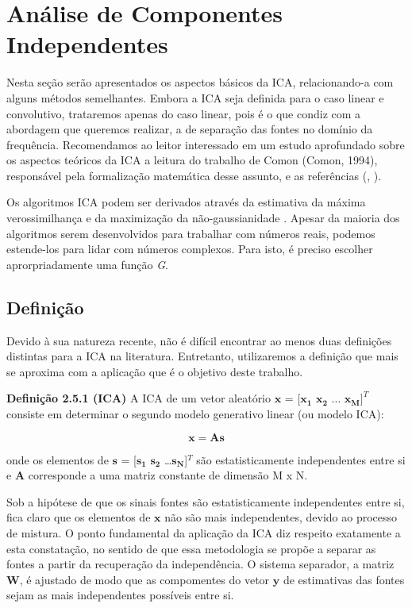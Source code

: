 \section{Análise de Componentes Independentes}
    Nesta seção serão apresentados os aspectos básicos da ICA, relacionando-a com alguns métodos semelhantes. Embora a ICA seja definida para o caso linear e convolutivo, trataremos apenas do caso linear, pois é o que condiz com a abordagem que queremos realizar, a de separação das fontes no domínio da frequência. Recomendamos ao leitor interessado em um estudo aprofundado sobre os aspectos teóricos da ICA a leitura do trabalho de Comon (Comon, 1994), responsável pela formalização matemática desse assunto, e as referências (\cite{ICA}, \cite{ICA3}).
    
    Os algoritmos ICA podem ser derivados através da estimativa da máxima verossimilhança \cite{ICAML} e da maximização da não-gaussianidade \cite{ICAgauss}. Apesar da maioria dos algoritmos serem desenvolvidos para trabalhar com números reais, podemos estende-los para lidar com números complexos. Para isto, é preciso escolher aprorpriadamente uma função \textit{G}.

\subsection{Definição}
    Devido à sua natureza recente, não é difícil encontrar ao menos duas definições distintas para a ICA na literatura. Entretanto, utilizaremos a definição que mais se aproxima com a aplicação que é o objetivo deste trabalho.
    
    \bigskip
    
    \textbf{Definição 2.5.1 (ICA)} A ICA de um vetor aleatório $\mathbf{x}$ = [$\mathbf{x_1}$ $\mathbf{x_2}$ $\dots$  $\mathbf{x_M}]^T$ consiste em determinar o segundo modelo generativo linear (ou modelo ICA):
    
    \begin{equation}\label{eq:simplifiedmixer}
        \mathbf{x} = \mathbf{A}\mathbf{s}
    \end{equation}
    
    onde os elementos de $\mathbf{s}$ = [$\mathbf{s_1}$ $\mathbf{s_2}$ \dots  $\mathbf{s_N}$]$^T$ são estatisticamente independentes entre si e $\mathbf{A}$ corresponde a uma matriz constante de dimensão M x N.

    \bigskip 
    
    Sob a hipótese de que os sinais fontes são estatisticamente independentes entre si, fica claro que os elementos de $\mathbf{x}$ não são mais independentes, devido ao processo de mistura. O ponto fundamental da aplicação da ICA diz respeito exatamente a esta constatação, no sentido de que essa metodologia se propõe a separar as fontes a partir da recuperação da independência. O sistema separador, a matriz $\mathbf{W}$, é ajustado de modo que as compomentes do vetor $\mathbf{y}$ de estimativas das fontes sejam as mais independentes possíveis entre si.
    
